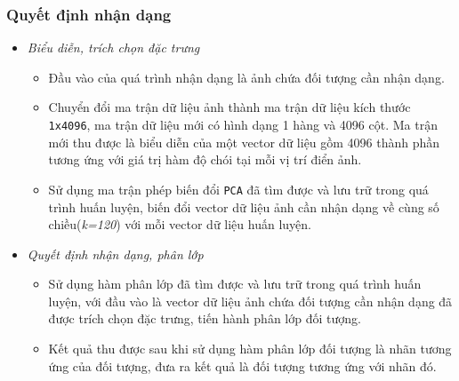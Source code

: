 \documentclass[12pt,a4paper]{article}
\begin{document}
\subsubsection{Quyết định nhận dạng}
\begin{itemize}
\item \textit{Biểu diễn, trích chọn đặc trưng}
\begin{itemize}
\item Đầu vào của quá trình nhận dạng là ảnh chứa đối tượng cần nhận dạng.
\item Chuyển đổi ma trận dữ liệu ảnh thành ma trận dữ liệu kích thước \texttt{1x4096}, ma trận dữ liệu mới có hình dạng 1 hàng và 4096 cột. Ma trận mới thu được là biểu diễn của một vector dữ liệu gồm 4096 thành phần tương ứng với giá trị hàm độ chói tại mỗi vị trí điển ảnh. 
\item Sử dụng ma trận phép biến đổi \texttt{PCA} đã tìm được và lưu trữ trong quá trình huấn luyện, biến đổi vector dữ liệu ảnh cần nhận dạng về cùng số chiều(\textit{k=120}) với mỗi vector dữ liệu huấn luyện.  
\end{itemize}
\item \textit{Quyết định nhận dạng, phân lớp}
\begin{itemize}
\item Sử dụng hàm phân lớp đã tìm được và lưu trữ trong quá trình huấn luyện, với đầu vào là vector dữ liệu ảnh chứa đối tượng cần nhận dạng đã được trích chọn đặc trưng, tiến hành phân lớp đối tượng. 
\item Kết quả thu được sau khi sử dụng hàm phân lớp đối tượng là nhãn tương ứng của đối tượng, đưa ra kết quả là đối tượng tương ứng với nhãn đó.
\end{itemize}
\end{itemize}
\end{document}

